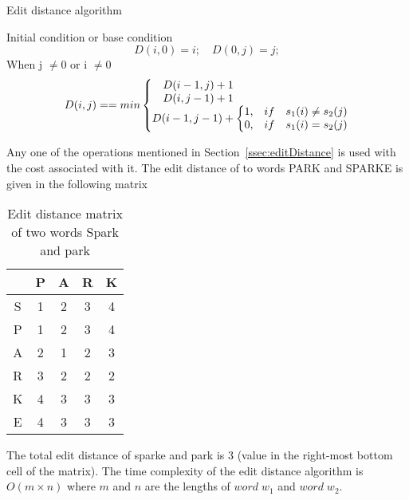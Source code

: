 \documentclass{bmcart}
\begin{document}
\begin{algorithm}[h!tb]
\caption{Edit distance algorithm}
\label{algo:modgd}
\begin{algorithmic}[1]

\STATE {}
\STATE Initial condition or base condition 
\begin{equation*}
D(i,0)=i;  \quad
D(0,j)=j;
\end{equation*}
\STATE When j $\neq 0$ or i $\neq 0$ 
\begin{equation*}
D(i,j)==min \left\{\begin{matrix}
\hspace{-3.3cm} D(i-1,j)+1 \\ 
\hspace{-3.3cm} D(i,j-1)+1 \\
D(i-1,j-1)+\left\{\begin{matrix}
1, & if \quad s_1(i) \neq s_2(j) \\ 
0, & if \quad s_1(i) = s_2(j)
\end{matrix}\right. 
\end{matrix}\right.
\end{equation*}
\end{algorithmic}
\end{algorithm}

Any one of the operations mentioned in Section~\ref{ssec:editDistance} is used with the cost associated with it. The edit distance of to words PARK and SPARKE is given in the following matrix

\begin{table}[h!tb]
\begin{tabular}{c|c|c|c|c}
    & P & A & R & K \\ \hline
 S & 1 & 2 & 3 & 4 \\ \hline
 P & 1 & 2 & 3 & 4 \\ \hline
 A & 2 & 1 & 2 & 3 \\ \hline
 R & 3 & 2 & 2 & 2 \\ \hline
 K & 4 & 3 & 3 & 3 \\  \hline
 E & 4 & 3 & 3 & 3 \\
\end{tabular}
\caption{Edit distance matrix of  two words Spark and park}
\label{tab:editDist_matrix}
\end{table}

The total edit distance of sparke and park is 3 (value in the right-most bottom cell of the matrix). The time complexity of the edit distance algorithm is $O(m\times n)$ where $m$ and $n$ are the lengths of $word \; w_1 $ and $ word \; w_2$.
\end{document}
